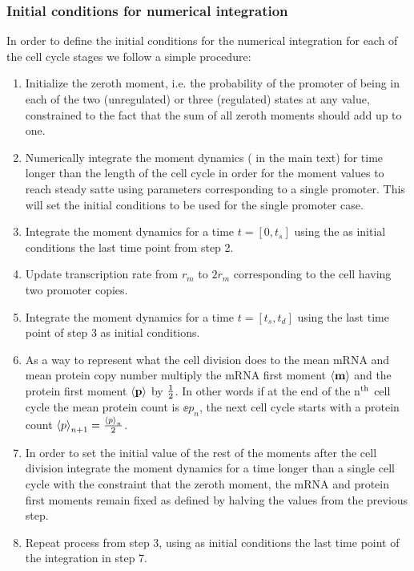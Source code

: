 \subsubsection{Initial conditions for numerical integration}

In order to define the initial conditions for the numerical integration for each
of the cell cycle stages we follow a simple procedure:
\begin{enumerate}
  \item Initialize the zeroth moment, i.e. the probability of the promoter of
  being in each of the two (unregulated) or three (regulated) states at any
  value, constrained to the fact that the sum of all zeroth moments should add
  up to one.
  \item Numerically integrate the moment dynamics ( in the
  main text) for time longer than the length of the cell cycle in order for the
  moment values to reach steady satte using parameters corresponding to a single
  promoter. This will set the initial conditions to be used for the single
  promoter case.
  \item Integrate the moment dynamics for a time $t = [0, t_s]$ using the
  as initial conditions the last time point from step 2.
  \item Update transcription rate from $r_m$ to $2 r_m$ corresponding to the
  cell having two promoter copies.
  \item Integrate the moment dynamics for a time $t = [t_s, t_d]$ using the
  last time point of step 3 as initial conditions.
  \item As a way to represent what the cell division does to the mean mRNA and
  mean protein copy number multiply the mRNA first moment $\left\langle \mathbf{m} \right\rangle$ and the
  protein first moment $\left\langle \mathbf{p} \right\rangle$ by $1 \over 2$. In other words if at the
  end of the n$^\text{th}$ cell cycle the mean protein count is $\ee{p}_n$, the
  next cell cycle starts with a protein count $\left\langle p \right\rangle_{n + 1} =
  {\left\langle p \right\rangle_n \over 2}$.
  \item In order to set the initial value of the rest of the moments after the
  cell division integrate the moment dynamics for a time longer than a single
  cell cycle with the constraint that the zeroth moment, the mRNA and protein
  first moments remain fixed as defined by halving the values from the previous
  step.
  \item Repeat process from step 3, using as initial conditions the last time
  point of the integration in step 7.
\end{enumerate}

